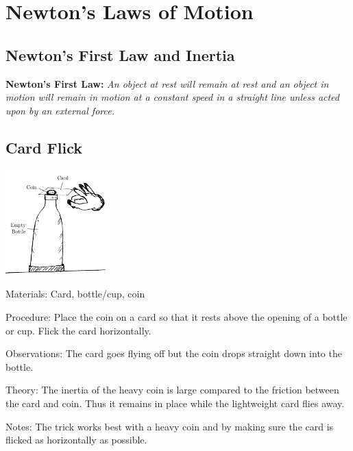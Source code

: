 \section{Newton's Laws of Motion}

\begin{multicols}{2}


\section*{Newton's First Law and Inertia}
\textbf{Newton's First Law: }\emph{An object at rest will remain at rest and an object in motion will remain in motion at a constant speed in a straight line unless acted upon by an external force.}

\subsection{Card Flick}

\begin{center}
\includegraphics[width=0.3\textwidth]{./img/inertia.png}
\end{center}

\begin{description*}
\item[Materials:]{Card, bottle/cup, coin}
\item[Procedure:]{Place the coin on a card so that it rests above the opening of a bottle or cup. Flick the card horizontally.}
\item[Observations:]{The card goes flying off but the coin drops straight down into the bottle.}
\item[Theory:]{The inertia of the heavy coin is large compared to the friction between the card and coin. Thus it remains in place while the lightweight card flies away.}
\item[Notes:]{The trick works best with a heavy coin and by making sure the card is flicked as horizontally as possible.}
\end{description*}


\end{multicols}

